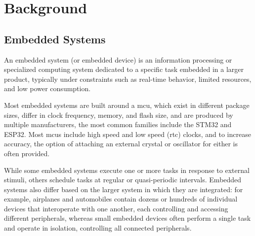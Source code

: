 

\chapter{Background}
\section{Embedded Systems}
\begin{definition} An embedded system (or embedded device) is an information processing or specialized computing system dedicated to a specific task embedded in a larger product, typically under constraints such as real-time behavior, limited resources, and low power consumption.
\end{definition}
Most embedded systems are built around a \gls{mcu}, which exist in different package sizes, differ in clock frequency, memory, and flash size, and are produced by multiple manufacturers, the most common families include the STM32 and ESP32. 
Most \gls{mcu}s include high speed and low speed (\gls{rtc}) clocks, and to increase accuracy, the option of attaching an external crystal or oscillator for either is often provided.

While some embedded systems execute one or more tasks in response to external stimuli, others schedule tasks at regular or quasi-periodic intervals. 
Embedded systems also differ based on the larger system in which they are integrated: for example, airplanes and automobiles contain dozens or hundreds of individual devices that interoperate with one another, each controlling and accessing different peripherals, whereas small embedded devices often perform a single task and operate in isolation, controlling all connected peripherals.

